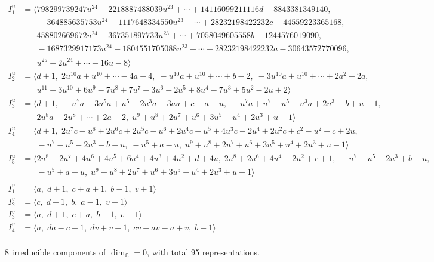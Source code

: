 \documentclass[1p]{elsarticle_modified}
\theoremstyle{definition}
\begin{document}
\begin{align*}
I^u_{1}&=\langle 
798299739247 u^{24}+2218887488039 u^{23}+\cdots+14116099211116 d-8843381349140,\\
\phantom{I^u_{1}}&\phantom{= \langle  }-364885635753 u^{24}+1117648334550 u^{23}+\cdots+28232198422232 c-44559223365168,\\
\phantom{I^u_{1}}&\phantom{= \langle  }458802669672 u^{24}+367351897733 u^{23}+\cdots+7058049605558 b-1244576019090,\\
\phantom{I^u_{1}}&\phantom{= \langle  }-1687329917173 u^{24}-1804551705088 u^{23}+\cdots+28232198422232 a-30643572770096,\\
\phantom{I^u_{1}}&\phantom{= \langle  }u^{25}+2 u^{24}+\cdots-16 u-8\rangle \\
I^u_{2}&=\langle 
d+1,\;2 u^{10} a+u^{10}+\cdots-4 a+4,\;- u^{10} a+u^{10}+\cdots+b-2,\;-3 u^{10} a+u^{10}+\cdots+2 a^2-2 a,\\
\phantom{I^u_{2}}&\phantom{= \langle  }u^{11}-3 u^{10}+6 u^9-7 u^8+7 u^7-3 u^6-2 u^5+8 u^4-7 u^3+5 u^2-2 u+2\rangle \\
I^u_{3}&=\langle 
d+1,\;- u^7 a-3 u^5 a+u^5-2 u^3 a-3 a u+c+a+u,\;- u^7 a+u^7+u^5- u^3 a+2 u^3+b+u-1,\\
\phantom{I^u_{3}}&\phantom{= \langle  }2 u^8 a-2 u^8+\cdots+2 a-2,\;u^9+u^8+2 u^7+u^6+3 u^5+u^4+2 u^3+u-1\rangle \\
I^u_{4}&=\langle 
d+1,\;2 u^7 c- u^8+2 u^6 c+2 u^5 c- u^6+2 u^4 c+u^5+4 u^3 c-2 u^4+2 u^2 c+c^2- u^2+c+2 u,\\
\phantom{I^u_{4}}&\phantom{= \langle  }- u^7- u^5-2 u^3+b- u,\;- u^5+a- u,\;u^9+u^8+2 u^7+u^6+3 u^5+u^4+2 u^3+u-1\rangle \\
I^u_{5}&=\langle 
2 u^8+2 u^7+4 u^6+4 u^5+6 u^4+4 u^3+4 u^2+d+4 u,\;2 u^8+2 u^6+4 u^4+2 u^2+c+1,\;- u^7- u^5-2 u^3+b- u,\\
\phantom{I^u_{5}}&\phantom{= \langle  }- u^5+a- u,\;u^9+u^8+2 u^7+u^6+3 u^5+u^4+2 u^3+u-1\rangle \\
\\
I^v_{1}&=\langle 
a,\;d+1,\;c+a+1,\;b-1,\;v+1\rangle \\
I^v_{2}&=\langle 
c,\;d+1,\;b,\;a-1,\;v-1\rangle \\
I^v_{3}&=\langle 
a,\;d+1,\;c+a,\;b-1,\;v-1\rangle \\
I^v_{4}&=\langle 
a,\;d a- c-1,\;d v+v-1,\;c v+a v- a+v,\;b-1\rangle \\
\end{align*}
\raggedright * 8 irreducible components of $\dim_{\mathbb{C}}=0$, with total 95 representations.\\
\end{document}
